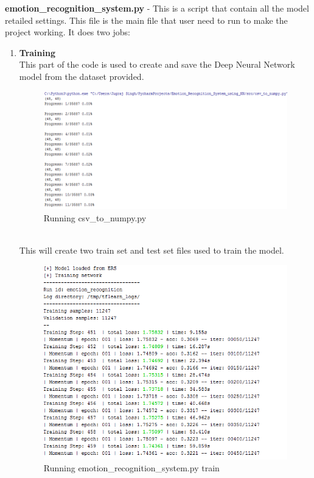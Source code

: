 \textbf{emotion\_recognition\_system.py} - This is a script that contain all the model retailed settings. This file is the main file that user need to run to make the project working. It does two jobs:
\begin{enumerate}
	\item \textbf{Training}\\
	This part of the code is used to create and save the Deep Neural Network model from the dataset provided.
	\begin{figure}[h]
		\centering\includegraphics[scale=0.5]{images/csv_run.png}
		\caption{Running csv\_to\_numpy.py}
	\end{figure}\\This will create two train set and test set files used to train the model.
	\begin{figure}[h]
		\centering\includegraphics[scale=0.85]{images/ers_train.png}
		\caption{Running emotion\_recognition\_system.py train}
	\end{figure}
\pagebreak


\end{enumerate}
